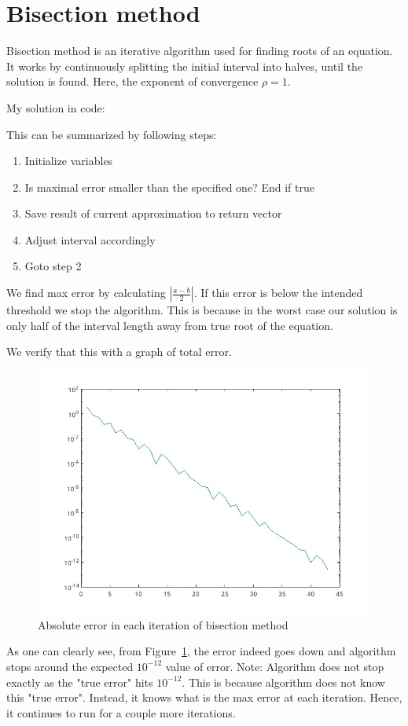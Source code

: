 \documentclass[11pt]{article}
\begin{document}
\newpage
\section{Bisection method}
Bisection method is an iterative algorithm used for finding roots of an
equation. It works by continuously splitting the initial interval into halves,
until the solution is found. Here, the exponent of convergence $\rho=1$.

My solution in code:


This can be summarized by following steps:
\begin{enumerate}
    \setlength\itemsep{0em}
    \item Initialize variables
    \item Is maximal error smaller than the specified one? End if true
    \item Save result of current approximation to return vector
    \item Adjust interval accordingly
    \item Goto step 2
\end{enumerate}
We find max error by calculating $|\frac{a-b}{2}|$. If this error is below the
intended threshold we stop the algorithm. This is because in the worst case our
solution is only half of the interval length away from true root of the 
equation.

We verify that this with a graph of total error.
\begin{figure}[ht!]
    \includegraphics[width=\textwidth]{bisection_test.jpg}
    \caption{Absolute error in each iteration of bisection method}
    \label{fig:bisection_test}
\end{figure}
As one can clearly see, from Figure~\ref{fig:bisection_test}, the error indeed
goes down and algorithm stops around the expected $10^{-12}$ value of error.
Note: Algorithm does not stop exactly as the "true error" hits $10^{-12}$. This
is because algorithm does not know this "true error". Instead, it knows what is
the max error at each iteration. Hence, it continues to run for a couple more
iterations.
\end{document}

